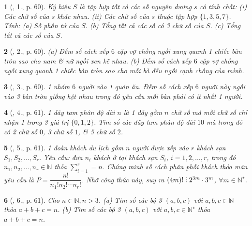 \documentclass{article}
\newtheorem{baitoan}{}
\DeclareRobustCommand{\divby}{%
	\mathrel{\vbox{\baselineskip.65ex\lineskiplimit0pt\hbox{.}\hbox{.}\hbox{.}}}%
}
\begin{document}
\begin{baitoan}[\cite{TLCT_BT_dai_so_giai_tich_11}, 1., p. 60]
	Ký hiệu $S$ là tập hợp tất cả các số nguyên dương $s$ có tính chất: (i) Các chữ số của $s$ khác nhau. (ii) Các chữ số của $s$ thuộc tập hợp $\{1,3,5,7\}$. Tính: (a) Số phần tử của $S$. (b) Tổng tất cả các số có 3 chữ số của $S$. (c) Tổng tất cả các số của $S$.
\end{baitoan}

\begin{baitoan}[\cite{TLCT_BT_dai_so_giai_tich_11}, 2., p. 60]
	(a) Đếm số cách xếp $6$ cặp vợ chồng ngồi xung quanh 1 chiếc bàn tròn sao cho nam \& nữ ngồi xen kẽ nhau. (b) Đếm số cách xếp $6$ cặp vợ chồng ngồi xung quanh 1 chiếc bàn tròn sao cho mỗi bà đều ngồi cạnh chồng của mình.
\end{baitoan}

\begin{baitoan}[\cite{TLCT_BT_dai_so_giai_tich_11}, 3., p. 60]
	1 nhóm $6$ người vào 1 quán ăn. Đếm số cách xếp $6$ người này ngồi vào 3 bàn tròn giống hệt nhau trong đó yêu cầu mỗi bàn phải có ít nhất 1 người.
\end{baitoan}

\begin{baitoan}[\cite{TLCT_BT_dai_so_giai_tich_11}, 4., p. 61]
	1 dãy tam phân độ dài $n$ là 1 dãy gồm $n$ chữ số mà mỗi chữ số chỉ nhận 1 trong 3 giá trị $\{0,1,2\}$. Tìm số các dãy tam phân độ dài $10$ mà trong đó có 2 chữ số $0$, 3 chữ số $1$, \& 5 chữ số $2$.
\end{baitoan}

\begin{baitoan}[\cite{TLCT_BT_dai_so_giai_tich_11}, 5., p. 61]
	1 đoàn khách du lịch gồm $n$ người được xếp vào $r$ khách sạn $S_1,S_2,\ldots,S_r$. Yêu cầu: đưa $n_i$ khách ở tại khách sạn $S_i$, $i = 1,2,\ldots,r$, trong đó $n_1,n_2,\ldots,n_r\in\mathbb{N}$ thỏa $\sum_{i=1}^r = n$. Chứng minh số cách phân phối khách thỏa mãn yêu cầu là $P = \dfrac{n!}{n_1!n_2!\cdots n_r!}$. Nhờ công thức này, suy ra $(4m)!\divby2^{3m}\cdot3^m$, $\forall m\in\mathbb{N}^\star$.
\end{baitoan}

\begin{baitoan}[\cite{TLCT_BT_dai_so_giai_tich_11}, 6., p. 61]
	Cho $n\in\mathbb{N},n > 3$. (a) Tìm số các bộ 3 $(a,b,c)$ với $a,b,c\in\mathbb{N}$ thỏa $a + b + c = n$. (b) Tìm số các bộ 3 $(a,b,c)$ với $a,b,c\in\mathbb{N}^\star$ thỏa $a + b + c = n$.
\end{baitoan}
\end{document}
